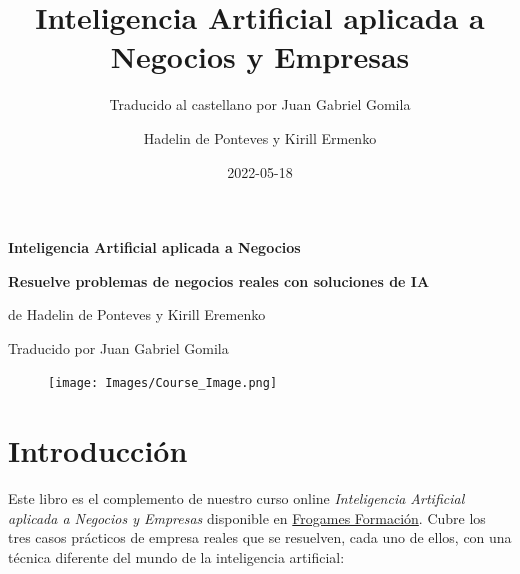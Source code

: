 \documentclass[
]{book}
\title{Inteligencia Artificial aplicada a Negocios y Empresas}
\subtitle{Traducido al castellano por Juan Gabriel Gomila}
\author{Hadelin de Ponteves y Kirill Ermenko}
\date{2022-05-18}
\begin{document}
\maketitle


\begin{titlepage}

\begin{center}

\Huge \textbf{Inteligencia Artificial aplicada a Negocios}

\Large \textbf{Resuelve problemas de negocios reales con soluciones de IA}

\large de Hadelin de Ponteves y Kirill Eremenko

\large Traducido por Juan Gabriel Gomila


\end{center}

\begin{figure}[!htbp]
		\begin{center}
			\texttt{[image: Images/Course\_Image.png]}
		\end{center}
\end{figure}

\end{titlepage}

{
\setcounter{tocdepth}{1}
\tableofcontents
}
\renewcommand{\contentsname}{Tabla de Contenidos}
\tableofcontents

\newpage

\hypertarget{introducciuxf3n}{%
\chapter*{Introducción}\label{introducciuxf3n}}

Este libro es el complemento de nuestro curso online \emph{Inteligencia Artificial aplicada a Negocios y Empresas} disponible en \href{https://cursos.frogamesformacion.com/courses/ia-aplicada-negocios?coupon=frogames30}{Frogames Formación}. Cubre los tres casos prácticos de empresa reales que se resuelven, cada uno de ellos, con una técnica diferente del mundo de la inteligencia artificial:
\end{document}
